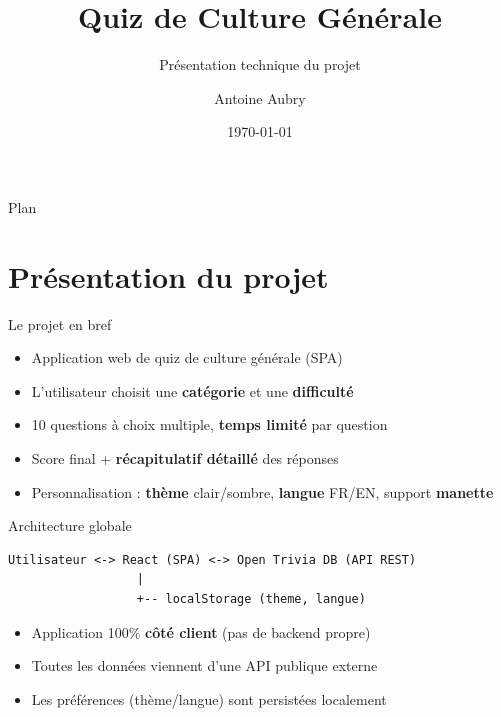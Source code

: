 \documentclass[aspectratio=169]{beamer}
\title{Quiz de Culture Générale}
\subtitle{Présentation technique du projet}
\author{Antoine Aubry}
\institute{HEIG-VD}
\date{\today}
\begin{document}
\begin{frame}
  \titlepage
\end{frame}

\begin{frame}{Plan}
  \tableofcontents
\end{frame}

\section{Présentation du projet}

\begin{frame}{Le projet en bref}
  \begin{itemize}
    \item Application web de quiz de culture générale (SPA)
    \item L'utilisateur choisit une \textbf{catégorie} et une \textbf{difficulté}
    \item 10 questions à choix multiple, \textbf{temps limité} par question
    \item Score final + \textbf{récapitulatif détaillé} des réponses
    \item Personnalisation : \textbf{thème} clair/sombre, \textbf{langue} FR/EN, support \textbf{manette}
  \end{itemize}
\end{frame}

\begin{frame}[fragile]{Architecture globale}
  \begin{center}
  \begin{lstlisting}
Utilisateur <-> React (SPA) <-> Open Trivia DB (API REST)
                  |
                  +-- localStorage (theme, langue)
  \end{lstlisting}
  \end{center}
  \vspace{0.5cm}
  \begin{itemize}
    \item Application 100\% \textbf{côté client} (pas de backend propre)
    \item Toutes les données viennent d'une API publique externe
    \item Les préférences (thème/langue) sont persistées localement
  \end{itemize}
\end{frame}

\end{document}
